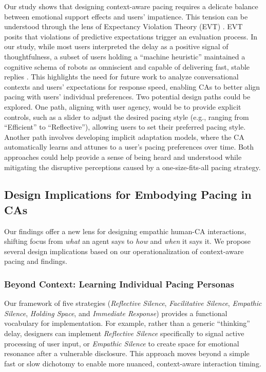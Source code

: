 Our study shows that designing context-aware pacing requires a delicate balance between emotional support effects and users' impatience. 
This tension can be understood through the lens of Expectancy Violation Theory (EVT) \cite{burgoon1978communication}. EVT posits that violations of predictive expectations trigger an evaluation process. In our study, while most users interpreted the delay as a positive signal of thoughtfulness, a subset of users holding a ``machine heuristic'' maintained a cognitive schema of robots as omniscient and capable of delivering fast, stable replies \cite{folstad2018makes}. This highlights the need for future work to analyze conversational contexts and users' expectations for response speed, enabling CAs to better align pacing with users' individual preferences. Two potential design paths could be explored. 
One path, aligning with user agency, would be to provide explicit controls, such as a slider to adjust the desired pacing style (e.g., ranging from ``Efficient'' to ``Reflective''), allowing users to set their preferred pacing style. Another path involves developing implicit adaptation models, where the CA automatically learns and attunes to a user's pacing preferences over time. Both approaches could help provide a sense of being heard and understood while mitigating the disruptive perceptions caused by a one-size-fits-all pacing strategy.


\subsection{Design Implications for Embodying Pacing in CAs}
Our findings offer a new lens for designing empathic human-CA interactions, shifting focus from \textit{what} an agent says to \textit{how} and \textit{when} it says it. We propose several design implications based on our operationalization of context-aware pacing and findings.

\subsubsection{Beyond Context: Learning Individual Pacing Personas}
\label{sec:discussion:personalization}
Our framework of five strategies (\emph{Reflective Silence}, \emph{Facilitative Silence}, \emph{Empathic Silence}, \emph{Holding Space}, and \emph{Immediate Response}) provides a functional vocabulary for implementation. For example, rather than a generic ``thinking'' delay, designers can implement \emph{Reflective Silence} specifically to signal active processing of user input, or \emph{Empathic Silence} to create space for emotional resonance after a vulnerable disclosure. This approach moves beyond a simple fast or slow dichotomy to enable more nuanced, context-aware interaction timing.


